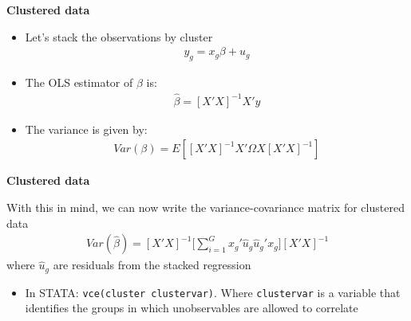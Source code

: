 \documentclass[notes=show]{beamer}
\begin{document}
\begin{frame}[plain]

\begin{center}
\textbf{Clustered data}
\end{center}

\begin{itemize}
\item Let's stack the observations by cluster
	\begin{eqnarray*}
	y_g = x_g\beta + u_g
	\end{eqnarray*}
\item The OLS estimator of $\beta$ is:
	\begin{eqnarray*}
	\widehat{\beta} = [X'X]^{-1}X'y
	\end{eqnarray*}
\item The variance is given by:	
	\begin{eqnarray*}
	Var(\beta) = E[[X'X]^{-1}X'\Omega X[X'X]^{-1}]
	\end{eqnarray*}
\end{itemize}

\end{frame}

\begin{frame}[plain]
\begin{center}
\textbf{Clustered data}
\end{center}

With this in mind, we can now write the variance-covariance matrix for clustered data
	\begin{eqnarray*}
	Var(\widehat{\beta}) = [X'X]^{-1}\big [ \sum_{i=1}^G x_g' \widehat{u}_g\widehat{u}_g'x_g][X'X]^{-1}
	\end{eqnarray*}
where $\hat{u}_g$ are residuals from the stacked regression
\begin{itemize}
\item In STATA: \texttt{vce(cluster clustervar)}. Where \texttt{clustervar} is a variable that identifies the groups in which unobservables are allowed to correlate
\end{itemize}
\end{frame}
\end{document}
